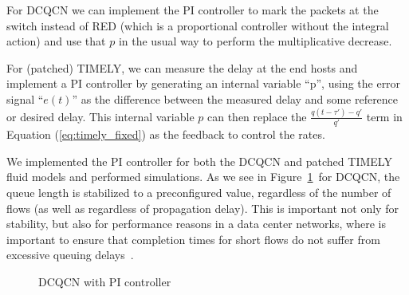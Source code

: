 For DCQCN we can implement the PI controller to mark the packets at the switch
instead of RED (which is a proportional controller without the integral action)
and use that $p$ in the usual way to perform the multiplicative decrease. 

For (patched) TIMELY, we can measure the delay at the end hosts and implement a
PI controller by generating an internal variable ``p'', using the error signal
``$e(t)$'' as the difference between the measured delay and some reference or
desired delay. This internal variable $p$ can then replace the $\tfrac{{q(t -
\tau ') - q'}}{{q'}}$ term in Equation (\ref{eq:timely_fixed}) as the feedback
to control the rates.

We implemented the PI controller for both the DCQCN and patched TIMELY fluid
models and performed simulations. As we see in Figure~\ref{fig:dcqcn_pi}~for
DCQCN, the queue length is stabilized to a preconfigured value, regardless of
the number of flows (as well as regardless of propagation delay). This is
important not only for stability, but also for performance reasons in a data
center networks, where is important to ensure that completion times for short
flows do not suffer from excessive queuing delays~\cite{dctcp}.

\begin{figure}
\caption{DCQCN with PI controller}
\label{fig:dcqcn_pi}
\vspace{-1em}
\end{figure}

